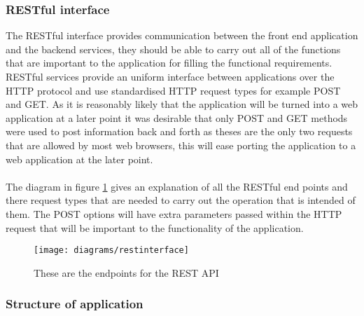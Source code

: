 \subsubsection*{RESTful interface}

The RESTful interface provides communication between the front end application and the backend services, they should be able to carry out all of the functions that are important to the application for filling the functional requirements. RESTful services provide an uniform interface between applications over the HTTP protocol and use standardised HTTP request types for example POST and GET. As it is reasonably likely that the application will be turned into a web application at a later point it was desirable that only POST and GET methods were used to post information back and forth as theses are the only two requests that are allowed by most web browsers, this will ease porting the application to a web application at the later point.\\
\\
The diagram in figure \ref{fig:rest_pai_diagram_image} gives an explanation of all the RESTful end points and there request types that are needed to carry out the operation that is intended of them. The POST options will have extra parameters passed within the HTTP request that will be important to the functionality of the application. 

\begin{figure}[H]
    \centering
    \texttt{[image: diagrams/restinterface]}
    \caption{These are the endpoints for the REST API}
    \label{fig:rest_pai_diagram_image}
\end{figure} 

\subsubsection*{Structure of application}


